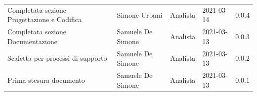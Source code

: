 \documentclass[a4paper]{article}
\begin{document}
\begin{center}
\begin{table}[h!]
\begin{tabular}{p{160px} p{90px} p{65px} p{60px} p{45px}}
            Completata sezione Progettazione e Codifica & Simone Urbani                               & Analista       & 2021-03-14    & 0.0.4             \\
            Completata sezione Documentazione           & Samuele De Simone                           & Analista       & 2021-03-13    & 0.0.3             \\
            Scaletta per processi di supporto           & Samuele De Simone                           & Analista       & 2021-03-13    & 0.0.2             \\
            Prima stesura documento                     & Samuele De Simone                           & Analista       & 2021-03-13    & 0.0.1             \\
        \end{tabular}
    \end{table}
\end{center}
\newpage
\tableofcontents
\newpage




\end{document}
